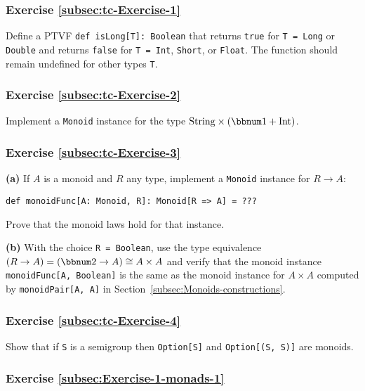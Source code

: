 \subsubsection{Exercise \label{subsec:tc-Exercise-1}\ref{subsec:tc-Exercise-1}}

Define a PTVF \lstinline!def isLong[T]: Boolean! that returns \lstinline!true!
for \lstinline!T = Long! or \lstinline!Double! and returns \lstinline!false!
for \lstinline!T = Int!, \lstinline!Short!, or \lstinline!Float!.
The function should remain undefined for other types \lstinline!T!.

\subsubsection{Exercise \label{subsec:tc-Exercise-2}\ref{subsec:tc-Exercise-2}}

Implement a \lstinline!Monoid! instance for the type $\text{String}\times(\bbnum 1+\text{Int})$.

\subsubsection{Exercise \label{subsec:tc-Exercise-3}\ref{subsec:tc-Exercise-3}}

\textbf{(a)} If $A$ is a monoid and $R$ any type, implement a \lstinline!Monoid!
instance for $R\rightarrow A$:
\begin{lstlisting}
def monoidFunc[A: Monoid, R]: Monoid[R => A] = ???
\end{lstlisting}
Prove that the monoid laws hold for that instance.

\textbf{(b)} With the choice \lstinline!R = Boolean!, use the type
equivalence $(R\rightarrow A)=(\bbnum 2\rightarrow A)\cong A\times A$
and verify that the monoid instance \lstinline!monoidFunc[A, Boolean]!
is the same as the monoid instance for $A\times A$ computed by \lstinline!monoidPair[A, A]!
in Section~\ref{subsec:Monoids-constructions}.

\subsubsection{Exercise \label{subsec:tc-Exercise-4}\ref{subsec:tc-Exercise-4}}

Show that if \lstinline!S! is a semigroup then \lstinline!Option[S]!
and \lstinline!Option[(S, S)]! are monoids.

\subsubsection{Exercise \label{subsec:Exercise-1-monads-1}\ref{subsec:Exercise-1-monads-1}}

